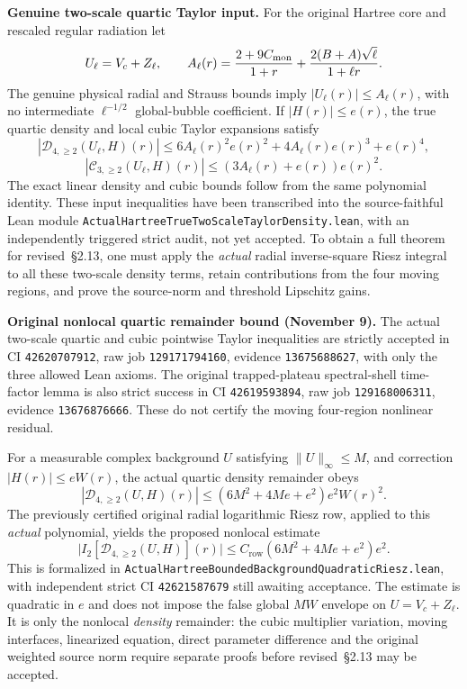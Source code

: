 \documentclass[11pt]{amsart}
\begin{document}
\medskip
\noindent\textbf{Genuine two-scale quartic Taylor input.}
For the original Hartree core and rescaled regular radiation let
\[
 U_\ell=V_c+Z_\ell,\qquad
 A_\ell(r)=\frac{2+9C_{\rm mon}}{1+r}
   +\frac{2(B+A)\sqrt\ell}{1+\ell r}.
\]
The genuine physical radial and Strauss bounds imply
$|U_\ell(r)|\le A_\ell(r)$, with no intermediate
$\ell^{-1/2}$ global-bubble coefficient. If $|H(r)|\le e(r)$,
the true quartic density and local cubic Taylor expansions satisfy
\[
 \left|\mathcal D_{4,\ge2}(U_\ell,H)(r)\right|
 \le 6A_\ell(r)^2 e(r)^2
       +4A_\ell(r)e(r)^3+e(r)^4,
\]
\[
 \left|\mathcal C_{3,\ge2}(U_\ell,H)(r)\right|
 \le (3A_\ell(r)+e(r))e(r)^2.
\]
The exact linear density and cubic bounds follow from the same
polynomial identity.  These input inequalities have been transcribed
into the source-faithful Lean module
\texttt{ActualHartreeTrueTwoScaleTaylorDensity.lean},
with an independently triggered strict audit, not yet accepted.
To obtain a full theorem for revised~\S2.13, one must apply the
\emph{actual} radial inverse-square Riesz integral to all these
two-scale density terms, retain contributions from the four moving
regions, and prove the source-norm and threshold Lipschitz gains.


\medskip
\noindent\textbf{Original nonlocal quartic remainder bound (November 9).}
The actual two-scale quartic and cubic pointwise Taylor inequalities
are strictly accepted in CI \texttt{42620707912},
raw job \texttt{129171794160}, evidence \texttt{13675688627},
with only the three allowed Lean axioms.
The original trapped-plateau spectral-shell time-factor lemma
is also strict success in CI \texttt{42619593894},
raw job \texttt{129168006311}, evidence \texttt{13676876666}.
These do not certify the moving four-region nonlinear residual.

For a measurable complex background $U$ satisfying
$\|U\|_\infty\le M$, and correction $|H(r)|\le e W(r)$,
the actual quartic density remainder obeys
\[
 |\mathcal D_{4,\ge2}(U,H)(r)|
 \le (6M^2+4Me+e^2)e^2W(r)^2.
\]
The previously certified original radial logarithmic Riesz row,
applied to this \emph{actual} polynomial, yields the proposed
nonlocal estimate
\[
 \bigl|I_2[\mathcal D_{4,\ge2}(U,H)](r)\bigr|
 \le C_{\mathrm{row}}(6M^2+4Me+e^2)e^2 .
\]
This is formalized in
\texttt{ActualHartreeBoundedBackgroundQuadraticRiesz.lean},
with independent strict CI \texttt{42621587679} still awaiting
acceptance. The estimate is quadratic in $e$ and does not impose
the false global $MW$ envelope on $U=V_c+Z_\ell$.
It is only the nonlocal \emph{density} remainder: the cubic multiplier
variation, moving interfaces, linearized equation, direct parameter
difference and the original weighted source norm require separate
proofs before revised~\S2.13 may be accepted.
\end{document}
